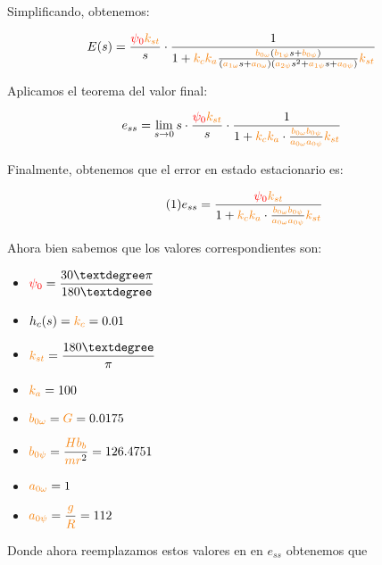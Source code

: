 Simplificando, obtenemos:

\begin{equation}
  E(s) = \frac{\rojo{\psi_0}\nara{k_{st}}}{s} \cdot \frac{1}{1+\nara{k_ck_a} \frac{\nara{\nara{b_{0\omega}}}\left(\nara{b_{1\psi}}s + \nara{b_{0\psi}}\right)}
  {\left(\nara{a_{1\omega}}s + \nara{a_{0\omega}}\right)\left(\nara{a_{2\psi}}s^{2} + \nara{a_{1\psi}}s + \nara{a_{0\psi}}\right)}\nara{k_{st}}}
\end{equation}


Aplicamos el teorema del valor final:

\begin{equation}
  e_{ss} = \lim_{s \to 0} s \cdot \frac{\rojo{\psi_0}\nara{k_{st}}}{s} \cdot \frac{1}{1 + \nara{k_c k_a} \cdot \frac{\nara{b_{0\omega}b_{0\psi}}}{\nara{a_{0\omega}a_{0\psi}}} \nara{k_{st}}}
\end{equation}


Finalmente, obtenemos que el error en estado estacionario es:


\begin{equation} \tag{1} \label{eq:e_ss_symbolic}
  e_{ss} = \frac{\rojo{\psi_0}\nara{k_{st}}}{1 + \nara{k_c k_a} \cdot \frac{\nara{b_{0\omega}b_{0\psi}}}{\nara{a_{0\omega}a_{0\psi}}} \nara{k_{st}}}
\end{equation}

Ahora bien sabemos que los valores correspondientes son:

\begin{multicols}{3}
  \begin{itemize}
    \item \( \rojo{\psi_0} = \displaystyle\frac{30° \pi}{180°} \)
    \item \(h_c(s) = \nara{k_c} = 0.01\)
    \item \(\nara{k_{st}} = \displaystyle\frac{180°}{\pi}\)
    \item \(\nara{k_{a}} = 100 \)
    \item \(\nara{b_{0\omega}} = \nara{G} =0.0175 \)
    \item \(\nara{b_{0\psi}} = \displaystyle\frac{\nara{Hb_b}}{\nara{mr}^2} = 126.4751\)
    \item \(\nara{a_{0\omega}} = 1 \)
    \item \(\nara{a_{0\psi}} = \displaystyle\frac{\nara{g}}{\nara{R}} =112 \)
  \end{itemize}
\end{multicols}


Donde ahora reemplazamos estos valores en  en \(e_{ss}\) obtenemos que 

